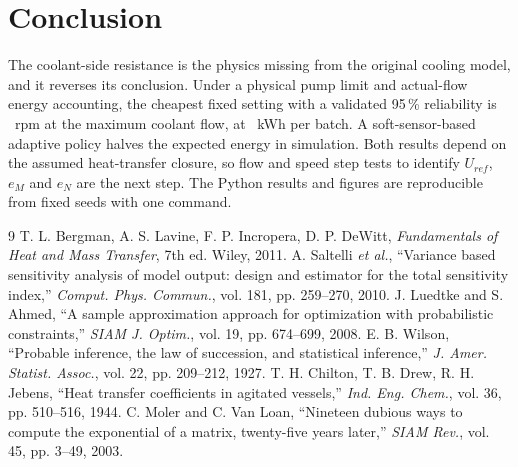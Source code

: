 \documentclass[conference,letterpaper]{IEEEtran}
\begin{document}
\begin{table}[!t]
\centering
\caption{Pass probability of the fixed and adaptive designs under three heat-transfer closures (stress set)}
\label{tab:scen}
\footnotesize

\end{table}

\section{Conclusion}
The coolant-side resistance is the physics missing from the original cooling model, and it reverses its conclusion. Under a physical pump limit and actual-flow energy accounting, the cheapest fixed setting with a validated 95\,\% reliability is \vRecRpm\ rpm at the maximum coolant flow, at \vRecE\ kWh per batch. A soft-sensor-based adaptive policy halves the expected energy in simulation. Both results depend on the assumed heat-transfer closure, so flow and speed step tests to identify \(U_{ref}\), \(e_M\) and \(e_N\) are the next step. The Python results and figures are reproducible from fixed seeds with one command.

\balance
\begin{thebibliography}{9}
\footnotesize
{} T. L. Bergman, A. S. Lavine, F. P. Incropera, D. P. DeWitt, \emph{Fundamentals of Heat and Mass Transfer}, 7th ed. Wiley, 2011.
 A. Saltelli \emph{et al.}, ``Variance based sensitivity analysis of model output: design and estimator for the total sensitivity index,'' \emph{Comput. Phys. Commun.}, vol. 181, pp. 259--270, 2010.
 J. Luedtke and S. Ahmed, ``A sample approximation approach for optimization with probabilistic constraints,'' \emph{SIAM J. Optim.}, vol. 19, pp. 674--699, 2008.
 E. B. Wilson, ``Probable inference, the law of succession, and statistical inference,'' \emph{J. Amer. Statist. Assoc.}, vol. 22, pp. 209--212, 1927.
 T. H. Chilton, T. B. Drew, R. H. Jebens, ``Heat transfer coefficients in agitated vessels,'' \emph{Ind. Eng. Chem.}, vol. 36, pp. 510--516, 1944.
 C. Moler and C. Van Loan, ``Nineteen dubious ways to compute the exponential of a matrix, twenty-five years later,'' \emph{SIAM Rev.}, vol. 45, pp. 3--49, 2003.
\end{thebibliography}
\end{document}
